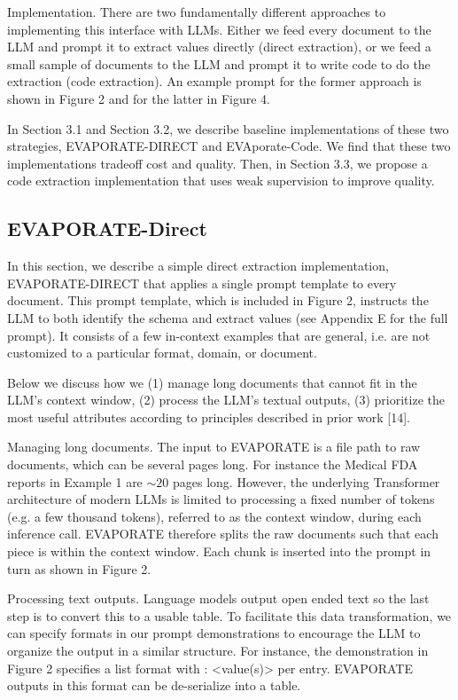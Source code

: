 \documentclass[10pt]{article}
\begin{document}
Implementation. There are two fundamentally different approaches to implementing this interface with LLMs. Either we feed every document to the LLM and prompt it to extract values directly (direct extraction), or we feed a small sample of documents to the LLM and prompt it to write code to do the extraction (code extraction). An example prompt for the former approach is shown in Figure 2 and for the latter in Figure 4.

In Section 3.1 and Section 3.2, we describe baseline implementations of these two strategies, EVAPORATE-DIRECT and EVAporate-Code. We find that these two implementations tradeoff cost and quality. Then, in Section 3.3, we propose a code extraction implementation that uses weak supervision to improve quality.

\subsection{EVAPORATE-Direct}
In this section, we describe a simple direct extraction implementation, EVAPORATE-DIRECT that applies a single prompt template to every document. This prompt template, which is included in Figure 2, instructs the LLM to both identify the schema and extract values (see Appendix E for the full prompt). It consists of a few in-context examples that are general, i.e. are not customized to a particular format, domain, or document.

Below we discuss how we (1) manage long documents that cannot fit in the LLM's context window, (2) process the LLM's textual outputs, (3) prioritize the most useful attributes according to principles described in prior work [14].

Managing long documents. The input to EVAPORATE is a file path to raw documents, which can be several pages long. For instance the Medical FDA reports in Example 1 are $\sim 20$ pages long. However, the underlying Transformer architecture of modern LLMs is limited to processing a fixed number of tokens (e.g. a few thousand tokens), referred to as the context window, during each inference call. EVAPORATE therefore splits the raw documents such that each piece is within the context window. Each chunk is inserted into the prompt in turn as shown in Figure 2.

Processing text outputs. Language models output open ended text so the last step is to convert this to a usable table. To facilitate this data transformation, we can specify formats in our prompt demonstrations to encourage the LLM to organize the output in a similar structure. For instance, the demonstration in Figure 2 specifies a list format with : <value(s)> per entry. EVAPORATE outputs in this format can be de-serialize into a table.
\end{document}
